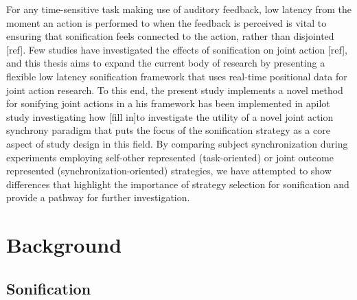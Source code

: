 \documentclass[10pt,a4paper,onecolumn]{article}
\begin{document}
For any time-sensitive task making use of auditory feedback, low latency from the moment an action is performed to when the feedback is perceived is vital to ensuring that sonification feels connected to the action, rather than disjointed {[}ref{]}. Few studies have investigated the effects of sonification on joint action {[}ref{]}, and this thesis aims to expand the current body of research by presenting a flexible low latency sonification framework that uses real-time positional data for joint action research. To this end, the present study implements a novel method for sonifying joint actions in a his framework has been implemented in apilot study investigating how {[}fill in{]}to investigate the utility of a novel joint action synchrony paradigm that puts the focus of the sonification strategy as a core aspect of study design in this field. By comparing subject synchronization during experiments employing self-other represented (task-oriented) or joint outcome represented (synchronization-oriented) strategies, we have attempted to show differences that highlight the importance of strategy selection for sonification and provide a pathway for further investigation.

\hypertarget{background}{%
\section{Background}\label{background}}

\hypertarget{sonification}{%
\subsection{Sonification}\label{sonification}}
\end{document}
